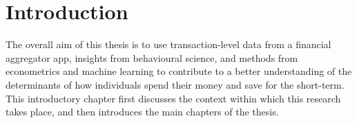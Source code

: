 
\chapter{Introduction}%
\label{cha:introduction}

The overall aim of this thesis is to use transaction-level data from a
financial aggregator app, insights from behavioural science, and methods from
econometrics and machine learning to contribute to a better understanding of
the determinants of how individuals spend their money and save for the
short-term. This introductory chapter first discusses the context within which
this research takes place, and then introduces the main chapters of the thesis.





